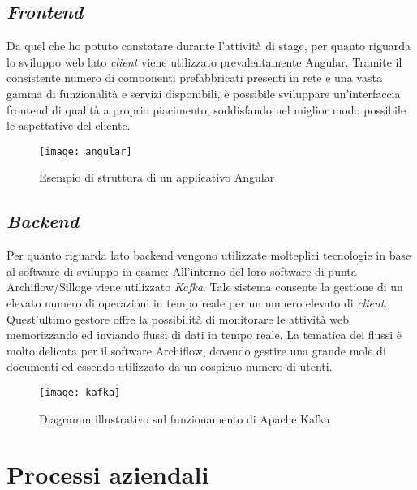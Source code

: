 \subsection{\textit{Frontend}}
Da quel che ho potuto constatare durante l'attività di stage, per quanto riguarda lo sviluppo web lato \textit{client} viene utilizzato prevalentamente Angular. Tramite il consistente numero di componenti prefabbricati presenti in rete e una vasta gamma di funzionalità e servizi disponibili, è possibile sviluppare un'interfaccia frontend di qualità a proprio piacimento, soddisfando nel miglior modo possibile le aspettative del cliente.
\begin{figure}[!h] 
	\centering 
	\texttt{[image: angular]} 
	\caption{Esempio di struttura di un applicativo Angular}
\end{figure}
\subsection{\textit{Backend}}
Per quanto riguarda lato backend vengono utilizzate molteplici tecnologie in base al software di sviluppo in esame: 
All'interno del loro software di punta Archiflow/Silloge viene utilizzato \textit{Kafka}. Tale sistema consente la gestione di un elevato numero di operazioni in tempo reale per un numero elevato di \textit{client}. Quest'ultimo gestore offre la possibilità di monitorare le attività web memorizzando ed inviando flussi di dati in tempo reale. La tematica dei flussi è molto delicata per il software Archiflow, dovendo gestire una grande mole di documenti ed essendo utilizzato da un cospicuo numero di utenti.
\begin{figure}[!h] 
	\centering 
	\texttt{[image: kafka]} 
	\caption{Diagramm illustrativo sul funzionamento di Apache Kafka}
\end{figure}
\section {Processi aziendali}
